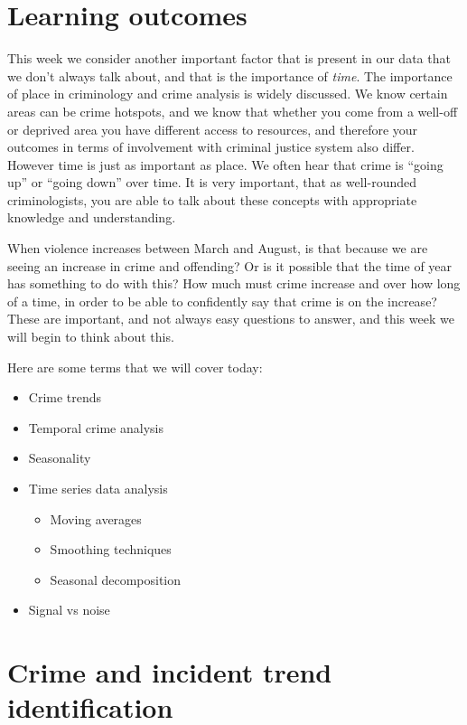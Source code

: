 \documentclass[
]{book}
\providecommand{\tightlist}{%
  \setlength{\itemsep}{0pt}\setlength{\parskip}{0pt}}
\begin{document}
\hypertarget{learning-outcomes-6}{%
\section{Learning outcomes}\label{learning-outcomes-6}}

This week we consider another important factor that is present in our data that we don't always talk about, and that is the importance of \emph{time}. The importance of place in criminology and crime analysis is widely discussed. We know certain areas can be crime hotspots, and we know that whether you come from a well-off or deprived area you have different access to resources, and therefore your outcomes in terms of involvement with criminal justice system also differ. However time is just as important as place. We often hear that crime is ``going up'' or ``going down'' over time. It is very important, that as well-rounded criminologists, you are able to talk about these concepts with appropriate knowledge and understanding.

When violence increases between March and August, is that because we are seeing an increase in crime and offending? Or is it possible that the time of year has something to do with this? How much must crime increase and over how long of a time, in order to be able to confidently say that crime is on the increase? These are important, and not always easy questions to answer, and this week we will begin to think about this.

Here are some terms that we will cover today:

\begin{itemize}
\tightlist
\item
  Crime trends
\item
  Temporal crime analysis
\item
  Seasonality
\item
  Time series data analysis

  \begin{itemize}
  \tightlist
  \item
    Moving averages
  \item
    Smoothing techniques
  \item
    Seasonal decomposition
  \end{itemize}
\item
  Signal vs noise
\end{itemize}

\hypertarget{crime-and-incident-trend-identification}{%
\section{Crime and incident trend identification}\label{crime-and-incident-trend-identification}}
\end{document}
